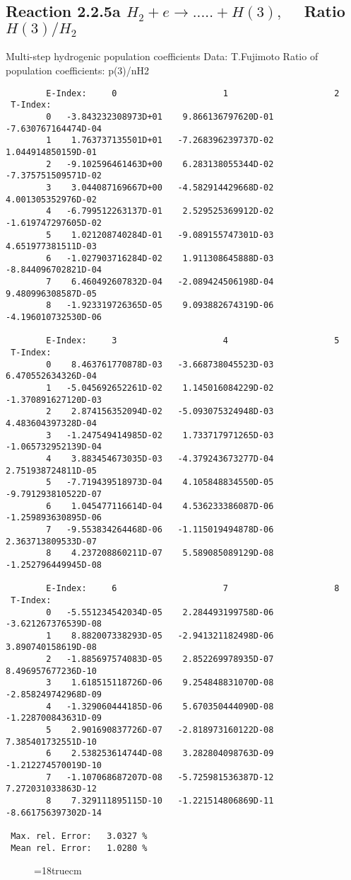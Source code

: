\subsection{
Reaction 2.2.5a $ H_2 + e \rightarrow .....+ H(3), \quad  $
Ratio $H(3)/H_2 $
}
 Multi-step hydrogenic population coefficients
 Data: T.Fujimoto
 Ratio of population coefficients: p(3)/nH2


\begin{verbatim}
        E-Index:     0                     1                     2
 T-Index:
        0   -3.843232308973D+01    9.866136797620D-01   -7.630767164474D-04
        1    1.763737135501D+01   -7.268396239737D-02    1.044914850159D-01
        2   -9.102596461463D+00    6.283138055344D-02   -7.375751509571D-02
        3    3.044087169667D+00   -4.582914429668D-02    4.001305352976D-02
        4   -6.799512263137D-01    2.529525369912D-02   -1.619747297605D-02
        5    1.021208740284D-01   -9.089155747301D-03    4.651977381511D-03
        6   -1.027903716284D-02    1.911308645888D-03   -8.844096702821D-04
        7    6.460492607832D-04   -2.089424506198D-04    9.480996308587D-05
        8   -1.923319726365D-05    9.093882674319D-06   -4.196010732530D-06

        E-Index:     3                     4                     5
 T-Index:
        0    8.463761770878D-03   -3.668738045523D-03    6.470552634326D-04
        1   -5.045692652261D-02    1.145016084229D-02   -1.370891627120D-03
        2    2.874156352094D-02   -5.093075324948D-03    4.483604397328D-04
        3   -1.247549414985D-02    1.733717971265D-03   -1.065732952139D-04
        4    3.883454673035D-03   -4.379243673277D-04    2.751938724811D-05
        5   -7.719439518973D-04    4.105848834550D-05   -9.791293810522D-07
        6    1.045477116614D-04    4.536233386087D-06   -1.259893630895D-06
        7   -9.553834264468D-06   -1.115019494878D-06    2.363713809533D-07
        8    4.237208860211D-07    5.589085089129D-08   -1.252796449945D-08

        E-Index:     6                     7                     8
 T-Index:
        0   -5.551234542034D-05    2.284493199758D-06   -3.621267376539D-08
        1    8.882007338293D-05   -2.941321182498D-06    3.890740158619D-08
        2   -1.885697574083D-05    2.852269978935D-07    8.496957677236D-10
        3    1.618515118726D-06    9.254848831070D-08   -2.858249742968D-09
        4   -1.329060444185D-06    5.670350444090D-08   -1.228700843631D-09
        5    2.901690837726D-07   -2.818973160122D-08    7.385401732551D-10
        6    2.538253614744D-08    3.282804098763D-09   -1.212274570019D-10
        7   -1.107068687207D-08   -5.725981536387D-12    7.272031033863D-12
        8    7.329111895115D-10   -1.221514806869D-11   -8.661756397302D-14

 Max. rel. Error:   3.0327 %
 Mean rel. Error:   1.0280 %

\end{verbatim}
\begin{figure} \label{2.2.5a}
\epsfxsize=18truecm
\end{figure}
\newpage
